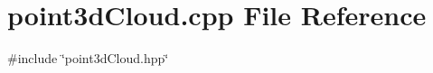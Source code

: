 \section{point3d\+Cloud.\+cpp File Reference}
\label{point3d_cloud_8cpp}
{\ttfamily \#include \char`\"{}point3d\+Cloud.\+hpp\char`\"{}}\newline
